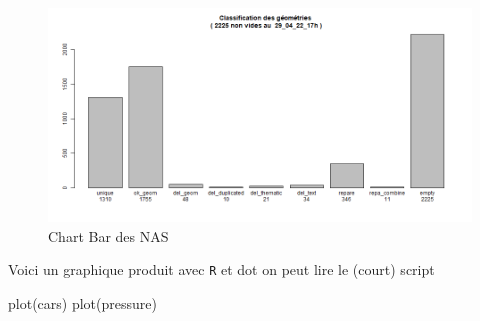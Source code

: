 \documentclass[
  a4paper,
]{scrbook}
\newenvironment{Shaded}{\begin{snugshade}}{\end{snugshade}}
\newcommand{\FunctionTok}[1]{\textcolor[rgb]{0.15,0.55,0.82}{#1}}
\newcommand{\NormalTok}[1]{\textcolor[rgb]{0.40,0.48,0.51}{#1}}
\begin{document}
\begin{figure}

{\centering \includegraphics{./figures/bar_classify_Del_29_04_22_17h.png}

}

\caption{Chart Bar des NAS}

\end{figure}

Voici un graphique produit avec \texttt{R} et dot on peut lire le
(court) script

\begin{Shaded}
\begin{Highlighting}[numbers=left,,]
\FunctionTok{plot}\NormalTok{(cars)}
\FunctionTok{plot}\NormalTok{(pressure)}
\end{Highlighting}
\end{Shaded}
\end{document}
